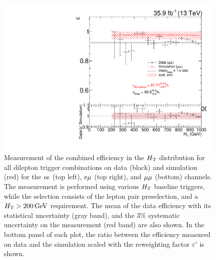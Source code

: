 \begin{figure}[htb]
 \includegraphics[width=\pairwidth]{figures/triggerStudies/efficiency_dataHT_trigDilep_ptcuts_MM_ht}
 \caption{Measurement of the combined efficiency in the $H_{\mathrm{T}}$ distribution for all dilepton trigger combinations on data (black) and simulation (red) for the $\mathrm{e}\mathrm{e}$ (top left), $\mathrm{e}\mu$ (top right), and $\mu\mu$ (bottom) channels. The measurement is performed using various $H_{\mathrm{T}}$ baseline triggers, while the selection consists of the lepton pair preselection, and a $H_{\mathrm{T}}>200\,\text{Ge\hspace{-.08em}V}$ requirement. The mean of the data efficiency with its statistical uncertainty (gray band), and the $3\%$ systematic uncertainty on the measurement (red band) are also shown. In the bottom panel of each plot, the ratio between the efficiency measured on data and the simulation scaled with the reweighting factor $\varepsilon'$ is shown.}
 \label{fig:app_triggEff3}
\end{figure}
